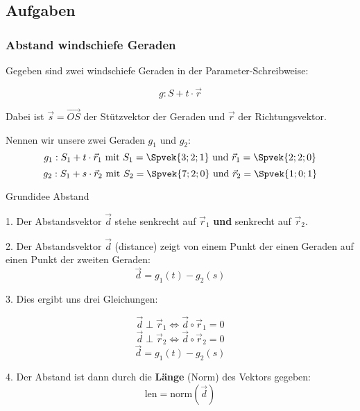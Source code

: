 
\subsection*{Aufgaben}
\newpage


\subsubsection{Abstand windschiefe Geraden}

Gegeben sind zwei windschiefe Geraden in der Parameter-Schreibweise:

$$g:  S+t\cdot{}\vec{r}$$

Dabei ist $\vec{s} = \overrightarrow{OS}$ der Stützvektor der Geraden
und $\vec{r}$ der Richtungsvektor.

Nennen wir unsere zwei Geraden $g_1$ und $g_2$:
$$g_1:  S_1+t\cdot{}\vec{r}_1 \text{ mit } S_1
= \Spvek{3;2;1} \text{ und } \vec{r}_1= \Spvek{2;2;0}$$
$$g_2:  S_1+s\cdot{}\vec{r}_2 \text{ mit } S_2
= \Spvek{7;2;0} \text{ und } \vec{r}_2= \Spvek{1;0;1}$$

\begin{rezept}{Grundidee Abstand}{}

  1. Der Abstandsvektor $\vec{d}$ stehe senkrecht auf $\vec{r}_1$
  \textbf{und} senkrecht auf $\vec{r}_2$.

  2. Der Abstandsvektor $\vec{d}$ (distance) zeigt von einem Punkt der einen Geraden auf
  einen Punkt der zweiten Geraden: $$\vec{d}=g_1(t)-g_2(s)$$

  3. Dies ergibt uns drei Gleichungen:

  $$\vec{d}\perp\vec{r}_1 \Longleftrightarrow{}  \vec{d}\circ{}\vec{r}_1 = 0$$
  $$\vec{d}\perp\vec{r}_2 \Longleftrightarrow{} \vec{d}\circ{}\vec{r}_2 = 0$$
  $$\vec{d}=g_1(t)-g_2(s)$$

  4. Der Abstand ist dann durch die \textbf{Länge} (Norm) des Vektors gegeben:
  $$\text{len} = \text{norm}(\vec{d})$$
  
\end{rezept}

